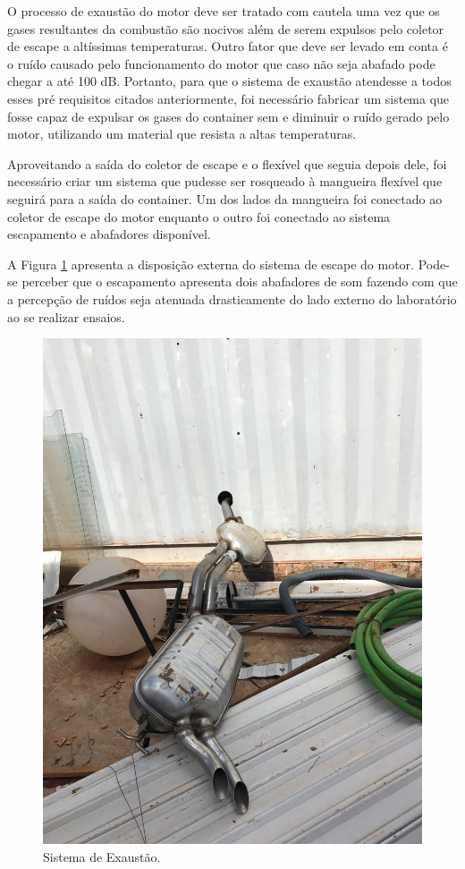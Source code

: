 O processo de exaustão do motor deve ser tratado com cautela uma vez que os gases resultantes da combustão são nocivos além de serem expulsos pelo coletor de escape a altíssimas temperaturas. Outro fator que deve ser levado em conta é o ruído causado pelo funcionamento do motor que caso não seja abafado pode chegar a até 100 dB. Portanto, para que o sistema de exaustão atendesse a todos esses pré requisitos citados anteriormente, foi necessário fabricar um sistema que fosse capaz de expulsar os gases do container sem e diminuir o ruído gerado pelo motor, utilizando um material que resista a altas temperaturas.

Aproveitando a saída do coletor de escape e o flexível que seguia depois dele, foi necessário criar um sistema que pudesse ser rosqueado à mangueira flexível que seguirá para a saída do container. Um dos lados da mangueira foi conectado ao coletor de escape do motor enquanto o outro foi conectado ao sistema escapamento e abafadores disponível.

A Figura \ref{fig:exaustao} apresenta a disposição externa do sistema de escape do motor. Pode-se perceber que o escapamento apresenta dois abafadores de som fazendo com que a percepção de ruídos seja atenuada drasticamente do lado externo do laboratório ao se realizar ensaios.

\begin{figure}[h!]
	\centering
	\includegraphics[keepaspectratio=true,scale= 0.2]{figuras/exautao.jpeg}
	\caption{Sistema de Exaustão.}
	\label{fig:exaustao}
\end{figure}


